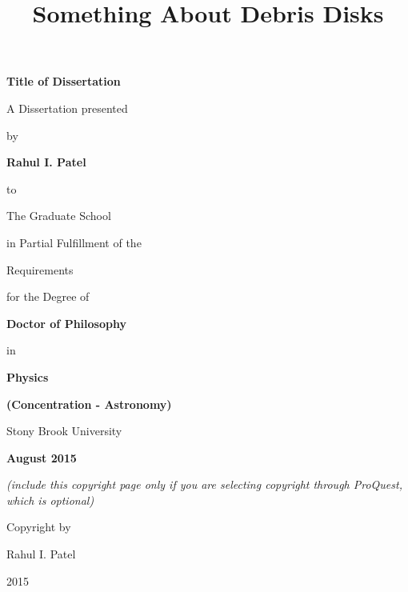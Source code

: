 \documentclass[12pt]{article}
\begin{document}
\title{\bf{Something About Debris Disks}}

\vspace*{3\baselineskip}
\centerline{\bf{Title of Dissertation}}
\vspace*{1\baselineskip}
\centerline{A Dissertation presented}
\vspace*{1\baselineskip}
\centerline{by} 
\vspace*{1\baselineskip}
\centerline{\bf{Rahul I. Patel}}
\vspace*{1\baselineskip}
\centerline{to} 
\vspace*{1\baselineskip}
\centerline{The Graduate School}
\vspace*{1\baselineskip}
\centerline{in Partial Fulfillment of the}
\vspace*{1\baselineskip}
\centerline{Requirements}
\vspace*{1\baselineskip}
\centerline{for the Degree of}
\vspace*{1\baselineskip}
\centerline{\bf{Doctor of Philosophy}}
\vspace*{1\baselineskip}
\centerline{in}
\vspace*{1\baselineskip}
\centerline{\bf{Physics}}
\vspace*{1\baselineskip}
\centerline{\bf{(Concentration - Astronomy)}}
\vspace*{2\baselineskip}
\centerline{Stony Brook University}
\vspace*{2\baselineskip}
\centerline{\bf{August 2015}}     

\newpage
{}

\vspace*{32\baselineskip}
\centerline{\it{(include this copyright page only if you are selecting copyright through ProQuest, which is optional)}}
\vspace*{1\baselineskip}
\centerline{Copyright by}
\centerline{Rahul I. Patel}
\centerline{2015}

\newpage
{}
\setcounter{page}{2}
\end{document}
